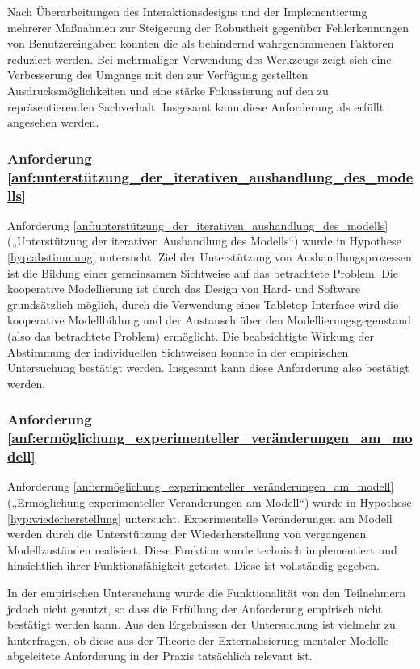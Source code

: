 Nach Überarbeitungen des Interaktionsdesigns und der Implementierung mehrerer Maßnahmen zur Steigerung der Robustheit gegenüber Fehlerkennungen von Benutzereingaben konnten die als behindernd wahrgenommenen Faktoren reduziert werden. Bei mehrmaliger Verwendung des Werkzeugs zeigt sich eine Verbesserung des Umgangs mit den zur Verfügung gestellten Ausdrucksmöglichkeiten und eine stärke Fokussierung auf den zu repräsentierenden Sachverhalt. Insgesamt kann diese Anforderung als erfüllt angesehen werden.

\subsubsection{Anforderung \ref{anf:unterstützung_der_iterativen_aushandlung_des_modells}}
Anforderung \ref{anf:unterstützung_der_iterativen_aushandlung_des_modells} („Unterstützung der iterativen Aushandlung des Modells“) wurde in Hypothese \ref{hyp:abstimmung} untersucht. Ziel der Unterstützung von Aushandlungsprozessen ist die Bildung einer gemeinsamen Sichtweise auf das betrachtete Problem. Die kooperative Modellierung ist durch das Design von Hard- und Software grundsätzlich möglich, durch die Verwendung eines Tabletop Interface wird die kooperative Modellbildung und der Austausch über den Modellierungsgegenstand (also das betrachtete Problem) ermöglicht. Die beabsichtigte Wirkung der Abstimmung der individuellen Sichtweisen konnte in der empirischen Untersuchung bestätigt werden. Insgesamt kann diese Anforderung also bestätigt werden.

\subsubsection{Anforderung \ref{anf:ermöglichung_experimenteller_veränderungen_am_modell}}
Anforderung \ref{anf:ermöglichung_experimenteller_veränderungen_am_modell} („Ermöglichung experimenteller Veränderungen am Modell“) wurde in Hypothese \ref{hyp:wiederherstellung} untersucht. Experimentelle Veränderungen am Modell werden durch die Unterstützung der Wiederherstellung von vergangenen Modellzuständen realisiert. Diese Funktion wurde technisch implementiert und hinsichtlich ihrer Funktionsfähigkeit getestet. Diese ist vollständig gegeben. 

In der empirischen Untersuchung wurde die Funktionalität von den Teilnehmern jedoch nicht genutzt, so dass die Erfüllung der Anforderung empirisch nicht bestätigt werden kann. Aus den Ergebnissen der Untersuchung ist vielmehr zu hinterfragen, ob diese aus der Theorie der Externalisierung mentaler Modelle abgeleitete Anforderung in der Praxis tatsächlich relevant ist.

